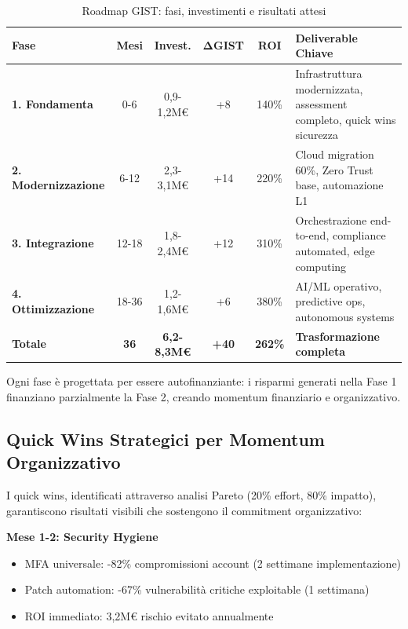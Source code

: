 \begin{table}[htbp]
\centering
\caption{Roadmap GIST: fasi, investimenti e risultati attesi}
\label{tab:roadmap_detailed}
\begin{tabular}{@{}p{2.5cm}ccccp{4cm}@{}}
\toprule
\textbf{Fase} & \textbf{Mesi} & \textbf{Invest.} & \textbf{ΔGIST} & \textbf{ROI} & \textbf{Deliverable Chiave} \\
\midrule
\rowcolor{blue!5}
\textbf{1. Fondamenta} & 0-6 & 0,9-1,2M€ & +8 & 140\% & Infrastruttura modernizzata, assessment completo, quick wins sicurezza \\
\rowcolor{green!5}
\textbf{2. Modernizzazione} & 6-12 & 2,3-3,1M€ & +14 & 220\% & Cloud migration 60\%, Zero Trust base, automazione L1 \\
\rowcolor{yellow!5}
\textbf{3. Integrazione} & 12-18 & 1,8-2,4M€ & +12 & 310\% & Orchestrazione end-to-end, compliance automated, edge computing \\
\rowcolor{orange!5}
\textbf{4. Ottimizzazione} & 18-36 & 1,2-1,6M€ & +6 & 380\% & AI/ML operativo, predictive ops, autonomous systems \\
\midrule
\textbf{Totale} & \textbf{36} & \textbf{6,2-8,3M€} & \textbf{+40} & \textbf{262\%} & \textbf{Trasformazione completa} \\
\bottomrule
\end{tabular}
\end{table}

Ogni fase è progettata per essere autofinanziante: i risparmi generati nella Fase 1 finanziano parzialmente la Fase 2, creando momentum finanziario e organizzativo.

\subsection{\texorpdfstring{Quick Wins Strategici per Momentum Organizzativo}{5.4.2 - Quick Wins}}
\label{subsec:5.4.2}

I quick wins, identificati attraverso analisi Pareto (20\% effort, 80\% impatto), garantiscono risultati visibili che sostengono il commitment organizzativo:

\textbf{Mese 1-2: Security Hygiene}
\begin{itemize}
\item MFA universale: -82\% compromissioni account (2 settimane implementazione)
\item Patch automation: -67\% vulnerabilità critiche exploitable (1 settimana)
\item ROI immediato: 3,2M€ rischio evitato annualmente
\end{itemize}

